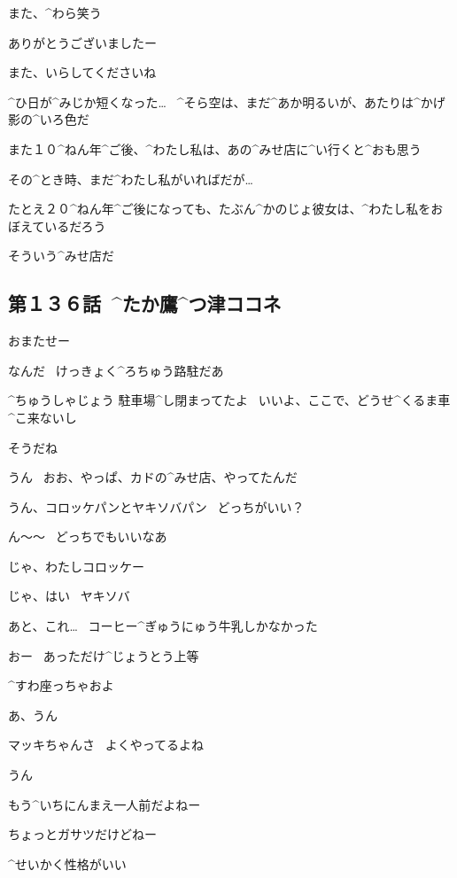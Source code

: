 \page[69]
\Narrator また、^{わら}{笑}う

\page[70]
\Alpha ありがとうございましたー

\Alpha また、いらしてくださいね

\page[71]
\Narrator ^{ひ}{日}が^{みじか}{短}くなった…
\ ^{そら}{空}は、まだ^{あか}{明}るいが、あたりは^{かげ}{影}の^{いろ}{色}だ

\Narrator また１０^{ねん}{年}^{ご}{後}、^{わたし}{私}は、あの^{みせ}{店}に^{い}{行}くと^{おも}{思}う

\Narrator その^{とき}{時}、まだ^{わたし}{私}がいればだが…

\Narrator たとえ２０^{ねん}{年}^{ご}{後}になっても、たぶん^{かのじょ}{彼女}は、^{わたし}{私}をおぼえているだろう

\page[72]
\Narrator そういう^{みせ}{店}だ


\subsection{第１３６話\ ^{たか}{鷹}^{つ}{津}ココネ}

\page[74]
\Kokone おまたせー

\page[75]
\Kokone なんだ
\ けっきょく^{ろちゅう}{路駐}だあ

\Shiba ^{ちゅうしゃじょう }{駐車場}^{し}{閉}まってたよ
\ いいよ、ここで、どうせ^{くるま}{車}^{こ}{来}ないし

\Kokone そうだね

\Shiba うん
\ おお、やっぱ、カドの^{みせ}{店}、やってたんだ

\page[76]
\Kokone うん、コロッケパンとヤキソバパン
\ どっちがいい？

\Shiba ん〜〜
\ どっちでもいいなあ

\Kokone じゃ、わたしコロッケー

\Kokone じゃ、はい
\ ヤキソバ

\Kokone あと、これ…
\ コーヒー^{ぎゅうにゅう}{牛乳}しかなかった

\Shiba おー
\ あっただけ^{じょうとう}{上等}

\Kokone ^{すわ}{座}っちゃおよ

\Shiba あ、うん

\page[78]
\Shiba マッキちゃんさ
\ よくやってるよね

\Kokone うん

\Kokone もう^{いちにんまえ}{一人前}だよねー

\Shiba ちょっとガサツだけどねー

\Shiba ^{せいかく}{性格}がいい

